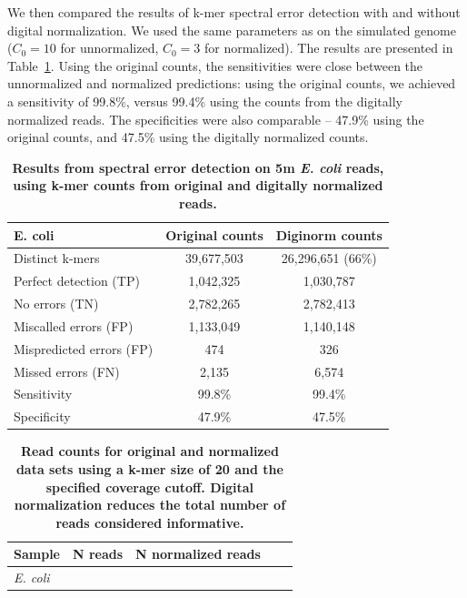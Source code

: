 \documentclass{article}
\begin{document}
We then compared the results of k-mer spectral error detection with
and without digital normalization.  We used the same parameters as on
the simulated genome ($C_0=10$ for unnormalized, $C_0=3$ for
normalized).  The results are presented in
Table~\ref{tab:ecoli_dn_counts}. Using the original counts, the
sensitivities were close between the unnormalized and normalized
predictions: using the original counts, we achieved a sensitivity of
99.8\%, versus 99.4\% using the counts from the digitally normalized
reads.  The specificities were also comparable -- 47.9\% using the original
counts, and 47.5\% using the digitally normalized counts.



\begin{table}
\begin{tabular}{|l|c|c|}
\hline
{\bf E. coli} & Original counts & Diginorm counts \\
\hline
Distinct k-mers         & 39,677,503 & 26,296,651 (66\%) \\
\hline
Perfect detection (TP)  & 1,042,325 & 1,030,787 \\
No errors (TN)          & 2,782,265 & 2,782,413 \\
Miscalled errors (FP)   & 1,133,049 & 1,140,148 \\
Mispredicted errors (FP)& 474       & 326       \\
Missed errors (FN)      & 2,135     & 6,574     \\
\hline
Sensitivity & 99.8\% & 99.4\% \\
Specificity & 47.9\% & 47.5\% \\
\hline
\end{tabular}

\caption{{\bf Results from spectral error detection on 5m {\em
      E. coli} reads, using k-mer counts from original and digitally
    normalized reads.}}

\label{tab:ecoli_dn_counts}
\end{table}

\begin{table}
\begin{tabular}{|l|c|c|c|c|}
\hline
Sample              & N reads & N normalized reads \\
\hline
{\em E. coli}       &            & \\
\hline
\end{tabular}

\caption{{\bf Read counts for original and normalized data sets using
    a k-mer size of 20 and the specified coverage cutoff. Digital
    normalization reduces the total number of reads considered
    informative.}}
\label{tab:read_counts}
\end{table}
\end{document}
